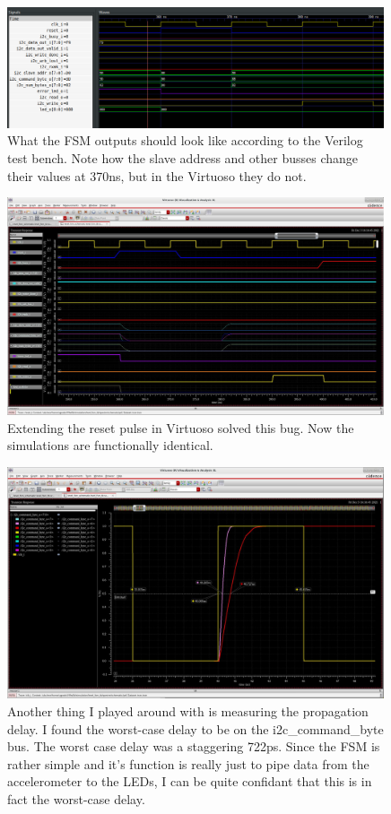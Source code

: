 \documentclass[11pt]{article}
\begin{document}
\begin{figure}[H]
    \centering
\includegraphics[width=0.99\textwidth]{disc2.png}
    \caption{What the FSM outputs should look like according to the Verilog test bench. Note how the slave address and other busses change their values at 370ns, but in the Virtuoso they do not.}
\end{figure}


\begin{figure}[H]
    \centering
\includegraphics[width=0.99\textwidth]{fixed.png}
    \caption{Extending the reset pulse in Virtuoso solved this bug. Now the simulations are functionally identical.}
\end{figure}


\begin{figure}[H]
    \centering
\includegraphics[width=0.99\textwidth]{delay.png}
    \caption{Another thing I played around with is measuring the propagation delay. I found the worst-case delay to be on the i2c\_command\_byte bus. The worst case delay was a staggering 722ps. Since the FSM is rather simple and it's function is really just to pipe data from the accelerometer to the LEDs, I can be quite confidant that this is in fact the worst-case delay.}
\end{figure}
\end{document}
